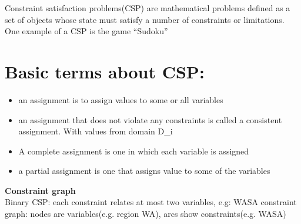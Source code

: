 Constraint satisfaction problems(CSP) are mathematical problems defined as a set of objects whose state must satisfy a number of constraints or limitations. One example of a CSP is the game “Sudoku” \\[3ex]

\section{Basic terms about CSP:}
\begin{itemize}
\item an assignment is to assign values to some or all variables
\item an assignment that does not violate any constraints is called a consistent assignment. With values from domain D\_i
\item A complete assignment is one in which each variable is assigned
\item a partial assignment is one that assigns value to some of the variables 
\end{itemize}


\textbf{Constraint graph}\\
Binary CSP: each constraint relates at most two variables, e.g: WASA
constraint graph: nodes are variables(e.g. region WA), arcs show constraints(e.g. WASA)\\[3ex]

